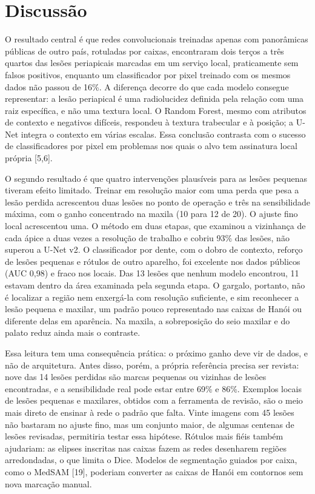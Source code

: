 \documentclass[twocolumn]{article}
\begin{document}
\section{Discussão}

O resultado central é que redes convolucionais treinadas apenas com panorâmicas públicas de outro país, rotuladas por caixas, encontraram dois terços a três quartos das lesões periapicais marcadas em um serviço local, praticamente sem falsos positivos, enquanto um classificador por pixel treinado com os mesmos dados não passou de 16\%. A diferença decorre do que cada modelo consegue representar: a lesão periapical é uma radiolucidez definida pela relação com uma raiz específica, e não uma textura local. O Random Forest, mesmo com atributos de contexto e negativos difíceis, respondeu à textura trabecular e à posição; a U-Net integra o contexto em várias escalas. Essa conclusão contrasta com o sucesso de classificadores por pixel em problemas nos quais o alvo tem assinatura local própria [5,6].

O segundo resultado é que quatro intervenções plausíveis para as lesões pequenas tiveram efeito limitado. Treinar em resolução maior com uma perda que pesa a lesão perdida acrescentou duas lesões no ponto de operação e três na sensibilidade máxima, com o ganho concentrado na maxila (10 para 12 de 20). O ajuste fino local acrescentou uma. O método em duas etapas, que examinou a vizinhança de cada ápice a duas vezes a resolução de trabalho e cobriu 93\% das lesões, não superou a U-Net v2. O classificador por dente, com o dobro de contexto, reforço de lesões pequenas e rótulos de outro aparelho, foi excelente nos dados públicos (AUC 0,98) e fraco nos locais. Das 13 lesões que nenhum modelo encontrou, 11 estavam dentro da área examinada pela segunda etapa. O gargalo, portanto, não é localizar a região nem enxergá-la com resolução suficiente, e sim reconhecer a lesão pequena e maxilar, um padrão pouco representado nas caixas de Hanói ou diferente delas em aparência. Na maxila, a sobreposição do seio maxilar e do palato reduz ainda mais o contraste.

Essa leitura tem uma consequência prática: o próximo ganho deve vir de dados, e não de arquitetura. Antes disso, porém, a própria referência precisa ser revista: nove das 14 lesões perdidas são marcas pequenas ou vizinhas de lesões encontradas, e a sensibilidade real pode estar entre 69\% e 86\%. Exemplos locais de lesões pequenas e maxilares, obtidos com a ferramenta de revisão, são o meio mais direto de ensinar à rede o padrão que falta. Vinte imagens com 45 lesões não bastaram no ajuste fino, mas um conjunto maior, de algumas centenas de lesões revisadas, permitiria testar essa hipótese. Rótulos mais fiéis também ajudariam: as elipses inscritas nas caixas fazem as redes desenharem regiões arredondadas, o que limita o Dice. Modelos de segmentação guiados por caixa, como o MedSAM [19], poderiam converter as caixas de Hanói em contornos sem nova marcação manual.
\end{document}
